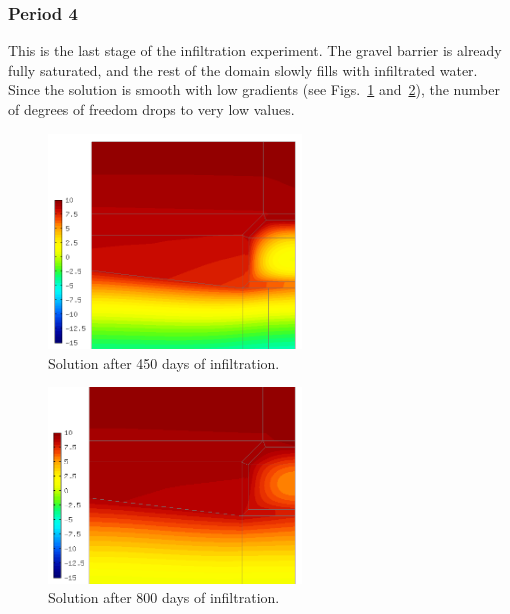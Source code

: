 \documentclass[final,3p,times,twocolumn]{elsarticle}
\begin{document}
\subsubsection{Period 4}

This is the last stage of the infiltration experiment. The gravel barrier is already 
fully saturated, and the rest of the domain  slowly fills with infiltrated water. Since
the solution is smooth with low gradients (see Figs.~\ref{fig:solution4.1} and~\ref{fig:solution4.2}), 
the number of degrees of freedom drops to very low values.


\begin{figure}[!htb]
\begin{center}
\vspace{0mm}
\includegraphics[height=5.7cm]{solution4-450.png}
\end{center}
\vspace{-4mm}
\caption{Solution after 450 days of infiltration. }
\label{fig:solution4.1}
\end{figure}

\begin{figure}[!htb]
\vspace{4mm}
\begin{center}
\includegraphics[height=5.2cm]{solution4-800.png}
\end{center}
\vspace{-4mm}
\caption{Solution after 800 days of infiltration.}
\label{fig:solution4.2}
\vspace{-0.4cm}
\end{figure}
\end{document}
